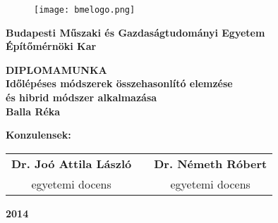 \begin{center}


\begin{figure}[t]
\centering
\texttt{[image: bmelogo.png]}
\end{figure}
\textbf{\large{Budapesti Műszaki és Gazdaságtudományi Egyetem \\ Építőmérnöki Kar} \\ }
\vspace{3.5cm}

\textbf{\huge {DIPLOMAMUNKA\\}}
\vspace{1 cm}
 \textbf{\Large {Időlépéses módszerek összehasonlító elemzése \\ és hibrid módszer alkalmazása\\}
  \vspace{2cm}														%
  \textbf{\Large{Balla Réka} \\ }}
\vspace{3.5cm}

 \textbf{\large{Konzulensek:\\}} 
 \vspace{0.8 cm}
\begin{tabular}{ccc}  
\textbf{ \large{Dr. Joó Attila László}} & \hspace{1.5 cm} & \textbf{\large{Dr. Németh Róbert}}\\
 \large{egyetemi docens} &   & \large{egyetemi docens}\\
\end{tabular}
 
 \vspace{3 cm}
\textbf{\Large{2014}}

\end{center}